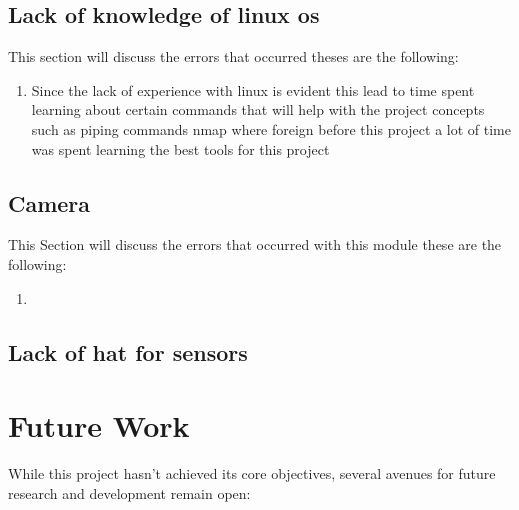 \subsection{Lack of knowledge of linux os}
This section will discuss the errors that occurred theses are the following:
\begin{enumerate}
    \item Since the lack of experience with linux  is evident  this lead to time spent learning about certain commands that will help with the project concepts such as  piping  commands nmap where  foreign before this project a lot of time was spent learning the best tools for this project
\end{enumerate}
\subsection{Camera}
This Section will discuss the errors that occurred with this module these are the following:
\begin{enumerate}
    \item 
\end{enumerate}
\subsection{Lack of hat for sensors}
\section{Future Work}

While this project hasn't achieved its core objectives, several avenues for future research and development remain open:

